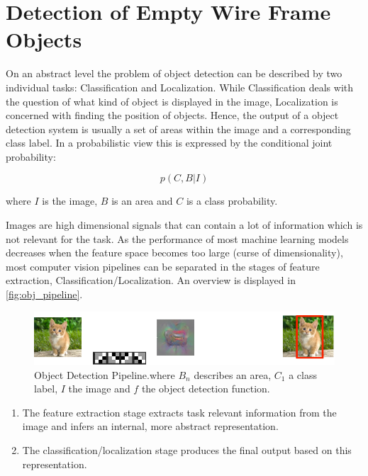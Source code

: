 	\chapter{Detection of Empty Wire Frame Objects}
	
	\label{sec:object_detection}
	
On an abstract level the problem of object detection can be described by two individual tasks: Classification and Localization. While Classification deals with the question of what kind of object is displayed in the image, Localization is concerned with finding the position of objects. Hence, the output of a object detection system is usually a set of areas within the image and a corresponding class label. In a probabilistic view this is expressed by the conditional joint probability:

	\begin{equation}
		p(C,B|I)
	\end{equation}

	where $I$ is the image, $B$ is an area and $C$ is a class probability.

	Images are high dimensional signals that can contain a lot of information which is not relevant for the task. As the performance of most machine learning models decreases when the feature space becomes too large (curse of dimensionality), most computer vision pipelines can be separated in the stages of feature extraction, Classification/Localization. An overview is displayed in \autoref{fig:obj_pipeline}.
	
	\begin{figure}[hbtp]
	
	\centering
	\includegraphics[width=\linewidth]{fig/ObjectDetection}
	\caption{Object Detection Pipeline.where $B_n$ describes an area, $C_1$ a class label, $I$ the image and $f$ the object detection function.}
	\label{fig:obj_pipeline}
	
	\end{figure}

	\begin{enumerate}
	\item The feature extraction stage extracts task relevant information from the image and infers an internal, more abstract representation.

	\item The classification/localization stage produces the final output based on this representation.

	\end{enumerate}

